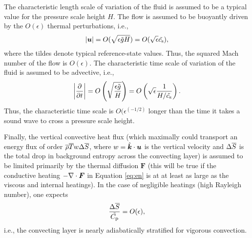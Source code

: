 \documentclass[12pt]{article}
\newcommand{\vecf}{\bm{F}}
\newcommand{\veck}{\hat{\bm{k}}}
\begin{document}
	The characteristic length scale of variation of the fluid is assumed to be a typical value for the pressure scale height $H$. The flow is assumed to be buoyantly driven by the $O(\epsilon)$ thermal perturbations, i.e., 
	\begin{align}\label{eq:scaleu}
		|\bm{u}| = O(\sqrt{\epsilon \tilde{g} H}) = O(\sqrt{\epsilon}\tilde{c_{\rm s}}),
	\end{align}
	where the tildes denote typical reference-state values. Thus, the squared Mach number of the flow is $O(\epsilon)$. The characteristic time scale of variation of the fluid is assumed to be advective, i.e., 
	\begin{align}\label{eq:scaleu}
	\left|\frac{\partial}{\partial t}\right| = O\left(\sqrt{\frac{\epsilon \tilde{g}}{H}}\right) = O\left(\sqrt{\epsilon} \frac{1}{H/\tilde{c_{\rm s}}}\right).
	\end{align}
	Thus, the characteristic time scale is $O(\epsilon^(-1/2)$ longer than the time it takes a sound wave to cross a pressure scale height. 
	
	Finally, the vertical convective heat flux (which maximally could transport an energy flux of order $\overline{\rho} \overline{T} w \Delta\overline{S}$, where $w=\veck\cdot\vecu$ is the vertical velocity and $\Delta \overline{S} $ is the total drop in background entropy across the convecting layer) is assumed to be limited primarily by the thermal diffusion $\vecf$ (this will be true if the conductive heating $-\Div \vecf$ in Equation \eqref{eq:en} is at at least as large as the viscous and internal heatings). In the case of negligible heatings (high Rayleigh number), one expects
	\begin{align}
		\frac{\Delta\overline{S}}{\tilde{C_{\rm{p}}}} = O(\epsilon),
	\end{align}
	i.e., the convecting layer is nearly adiabatically stratified for vigorous convection. 
	\newpage
		
\end{document}
